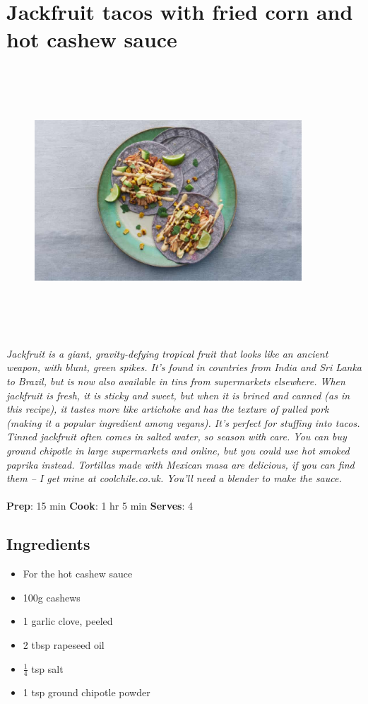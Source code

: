 \documentclass{book}
\begin{document}
\section{Jackfruit tacos with fried corn and hot cashew sauce}
\begin{figure}
\centering\includegraphics[width=10cm,height=10cm,keepaspectratio]{Recipe_Pictures/Jackfruit_tacos_with_fried_corn_and_hot_cashew_sauce.png}
\end{figure}
\emph{Jackfruit is a giant, gravity-defying tropical fruit that looks like an ancient weapon, with blunt, green spikes. It’s found in countries from India and Sri Lanka to Brazil, but is now also available in tins from supermarkets elsewhere. When jackfruit is fresh, it is sticky and sweet, but when it is brined and canned (as in this recipe), it tastes more like artichoke and has the texture of pulled pork (making it a popular ingredient among vegans). It’s perfect for stuffing into tacos.\\ 
Tinned jackfruit often comes in salted water, so season with care. You can buy ground chipotle in large supermarkets and online, but you could use hot smoked paprika instead. Tortillas made with Mexican masa are delicious, if you can find them – I get mine at coolchile.co.uk. You’ll need a blender to make the sauce.}\\\\ 
\textbf{Prep}: 15 min
\textbf{Cook}: 1 hr 5 min
\textbf{Serves}: 4
\subsection*{Ingredients}
\begin{itemize}
\item For the hot cashew sauce 
\item 100g cashews
\item 1 garlic clove, peeled
\item 2 tbsp rapeseed oil 
\item $\frac{1}{4}$ tsp salt 
\item 1 tsp ground chipotle powder 
\end{itemize}
\end{document}
